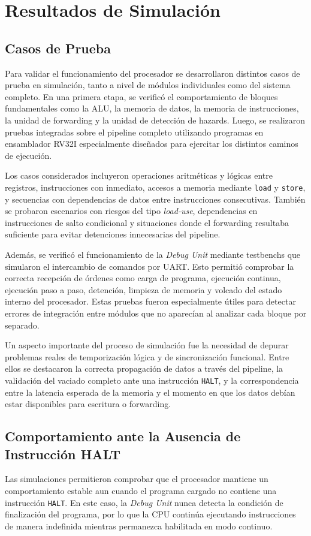 \newpage

\section{Resultados de Simulación}

\subsection{Casos de Prueba}
Para validar el funcionamiento del procesador se desarrollaron distintos casos de prueba en simulación, tanto a nivel de módulos individuales como del sistema completo. En una primera etapa, se verificó el comportamiento de bloques fundamentales como la ALU, la memoria de datos, la memoria de instrucciones, la unidad de forwarding y la unidad de detección de hazards. Luego, se realizaron pruebas integradas sobre el pipeline completo utilizando programas en ensamblador RV32I especialmente diseñados para ejercitar los distintos caminos de ejecución.

Los casos considerados incluyeron operaciones aritméticas y lógicas entre registros, instrucciones con inmediato, accesos a memoria mediante \texttt{load} y \texttt{store}, y secuencias con dependencias de datos entre instrucciones consecutivas. También se probaron escenarios con riesgos del tipo \textit{load-use}, dependencias en instrucciones de salto condicional y situaciones donde el forwarding resultaba suficiente para evitar detenciones innecesarias del pipeline.

Además, se verificó el funcionamiento de la \textit{Debug Unit} mediante testbenchs que simularon el intercambio de comandos por UART. Esto permitió comprobar la correcta recepción de órdenes como carga de programa, ejecución continua, ejecución paso a paso, detención, limpieza de memoria y volcado del estado interno del procesador. Estas pruebas fueron especialmente útiles para detectar errores de integración entre módulos que no aparecían al analizar cada bloque por separado.

Un aspecto importante del proceso de simulación fue la necesidad de depurar problemas reales de temporización lógica y de sincronización funcional. Entre ellos se destacaron la correcta propagación de datos a través del pipeline, la validación del vaciado completo ante una instrucción \texttt{HALT}, y la correspondencia entre la latencia esperada de la memoria y el momento en que los datos debían estar disponibles para escritura o forwarding.

\subsection{Comportamiento ante la Ausencia de Instrucción HALT}
Las simulaciones permitieron comprobar que el procesador mantiene un comportamiento estable aun cuando el programa cargado no contiene una instrucción \texttt{HALT}. En este caso, la \textit{Debug Unit} nunca detecta la condición de finalización del programa, por lo que la CPU continúa ejecutando instrucciones de manera indefinida mientras permanezca habilitada en modo continuo.

